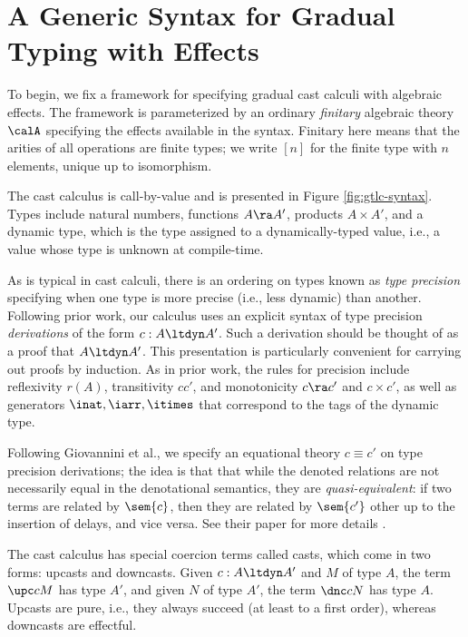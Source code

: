 \documentclass[acmsmall,screen,review,anonymous]{acmart}
\theoremstyle{remark}
\begin{document}
\section{A Generic Syntax for Gradual Typing with Effects}\label{sec:syntax}

To begin, we fix a framework for specifying gradual cast calculi with algebraic
effects. The framework is parameterized by an ordinary \emph{finitary} algebraic
theory $\calA$ specifying the effects available in the syntax. Finitary here
means that the arities of all operations are finite types; we write $[n]$ for
the finite type with $n$ elements, unique up to isomorphism.

The cast calculus is call-by-value and is presented in Figure
\ref{fig:gtlc-syntax}.
%
Types include natural numbers, functions $A \ra A'$, products $A \times A'$, and
a dynamic type, which is the type assigned to a dynamically-typed value, i.e., a
value whose type is unknown at compile-time.

As is typical in cast calculi, there is an ordering on types known as \emph{type
precision} specifying when one type is more precise (i.e., less dynamic) than
another. Following prior work, our calculus uses an explicit syntax of type
precision \emph{derivations} of the form $c : A \ltdyn A'$. Such a derivation
should be thought of as a proof that $A \ltdyn A'$. This presentation is
particularly convenient for carrying out proofs by induction.
%
As in prior work, the rules for precision include reflexivity $r(A)$,
transitivity $cc'$, and monotonicity $c \ra c'$ and $c \times c'$, as well as
generators $\inat,\iarr,\itimes$ that correspond to the tags of the dynamic
type.

Following Giovannini et al., we specify an equational theory $c \equiv c'$
on type precision derivations; the idea is that that while the denoted
relations are not necessarily equal in the denotational semantics, they are
\emph{quasi-equivalent}: if two terms are related by $\sem{c}$, then they are
related by $\sem{c'}$ other up to the insertion of delays, and vice versa. See
their paper for more details \cite{gtt-sgdt}.

The cast calculus has special coercion terms called casts, which come in two
forms: upcasts and downcasts. Given $c : A \ltdyn A'$ and $M$ of type $A$, the
term $\upc c M$ has type $A'$, and given $N$ of type $A'$, the term $\dnc c N$
has type $A$. Upcasts are pure, i.e., they always succeed (at least to a first
order), whereas downcasts are effectful.
\end{document}
